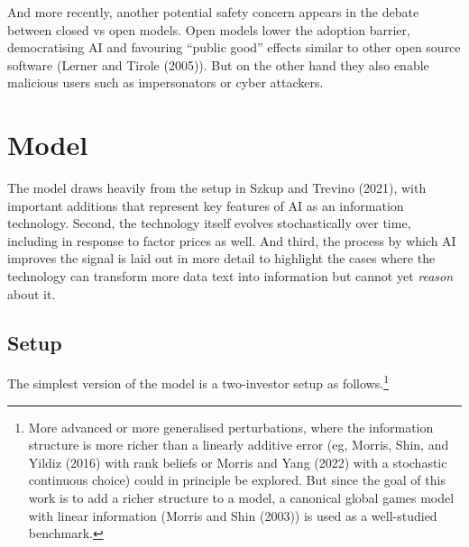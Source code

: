 \documentclass[
]{article}
\theoremstyle{plain}
\theoremstyle{definition}
\theoremstyle{remark}
\begin{document}
And more recently, another potential safety concern appears in the
debate between closed vs open models. Open models lower the adoption
barrier, democratising AI and favouring ``public good'' effects similar
to other open source software (Lerner and Tirole (2005)). But on the
other hand they also enable malicious users such as impersonators or
cyber attackers.

\section{Model}\label{model}

The model draws heavily from the setup in Szkup and Trevino (2021), with
important additions that represent key features of AI as an information
technology. Second, the technology itself evolves stochastically over
time, including in response to factor prices as well. And third, the
process by which AI improves the signal is laid out in more detail to
highlight the cases where the technology can transform more data text
into information but cannot yet \emph{reason} about it.

\subsection{Setup}\label{setup}

The simplest version of the model is a two-investor setup as
follows.\footnote{More advanced or more generalised perturbations, where
  the information structure is more richer than a linearly additive
  error (eg, Morris, Shin, and Yildiz (2016) with rank beliefs or Morris
  and Yang (2022) with a stochastic continuous choice) could in
  principle be explored. But since the goal of this work is to add a
  richer structure to a model, a canonical global games model with
  linear information (Morris and Shin (2003)) is used as a well-studied
  benchmark.}
\end{document}
